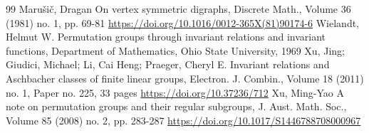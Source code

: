 \documentclass[10pt]{amsart}
\theoremstyle{definition}
\theoremstyle{plain}
\theoremstyle{plain}
\theoremstyle{plain}
\theoremstyle{plain}
\begin{document}
\begin{thebibliography}{99}
 Marušič, Dragan On vertex symmetric digraphs, Discrete Math., Volume 36 (1981) no. 1, pp. 69-81 \url{https://doi.org/10.1016/0012-365X(81)90174-6}
 Wielandt, Helmut W. Permutation groups through invariant relations and invariant functions, Department of Mathematics, Ohio State University, 1969
 Xu, Jing; Giudici, Michael; Li, Cai Heng; Praeger, Cheryl E. Invariant relations and Aschbacher classes of finite linear groups, Electron. J. Combin., Volume 18 (2011) no. 1, Paper no. 225, 33 pages \url{https://doi.org/10.37236/712}
 Xu, Ming-Yao A note on permutation groups and their regular subgroups, J. Aust. Math. Soc., Volume 85 (2008) no. 2, pp. 283-287 \url{https://doi.org/10.1017/S1446788708000967}
\end{thebibliography}
\end{document}
